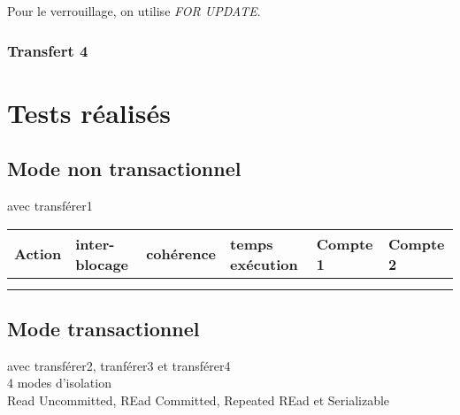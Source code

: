 \documentclass[11pt, a4paper, french, twoside]{article}
\begin{document}
    Pour le verrouillage, on utilise \textit{FOR UPDATE}.
    
    
    
    \subsubsection*{Transfert 4}
    
    
    
	\section*{Tests réalisés}
    
	\subsection*{Mode non transactionnel}
	avec transférer1
	
		\begin{tabular}{|l|l|l|l|l|l|}
		\hline
		 Action & inter-blocage & cohérence & temps exécution & Compte 1 & Compte 2\\
		\hline
		\rowcolor{lightgray}\multicolumn{6}{|l|}{transférer1}\\
		\hline
		 & & & & &\\
		\hline
	\end{tabular}
	
	
	\subsection*{Mode transactionnel}
	avec transférer2, tranférer3 et transférer4\\
	4 modes d'isolation\\
	Read Uncommitted, REad Committed, Repeated REad et Serializable
	
\end{document}
